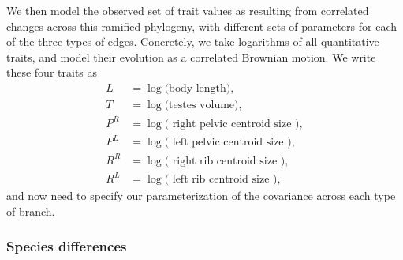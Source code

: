 \documentclass[12pt]{article}
\begin{document}
We then model the observed set of trait values as resulting from correlated changes across this ramified phylogeny,
with different sets of parameters for each of the three types of edges.
Concretely, we take logarithms of all quantitative traits,
and model their evolution as a correlated Brownian motion.
We write these four traits as
\begin{align}
    L &= \log \text{(body length)}, \\
    T &= \log \text{(testes volume)}, \\
    P^R &= \log \text{( right pelvic centroid size )}, \\
    P^L &= \log \text{( left pelvic centroid size )}, \\
    R^R &= \log \text{( right rib centroid size )}, \\
    R^L &= \log \text{( left rib centroid size )},
\end{align}
and now need to specify our parameterization of the covariance across each type of branch.

\subsubsection*{Species differences}
\end{document}
